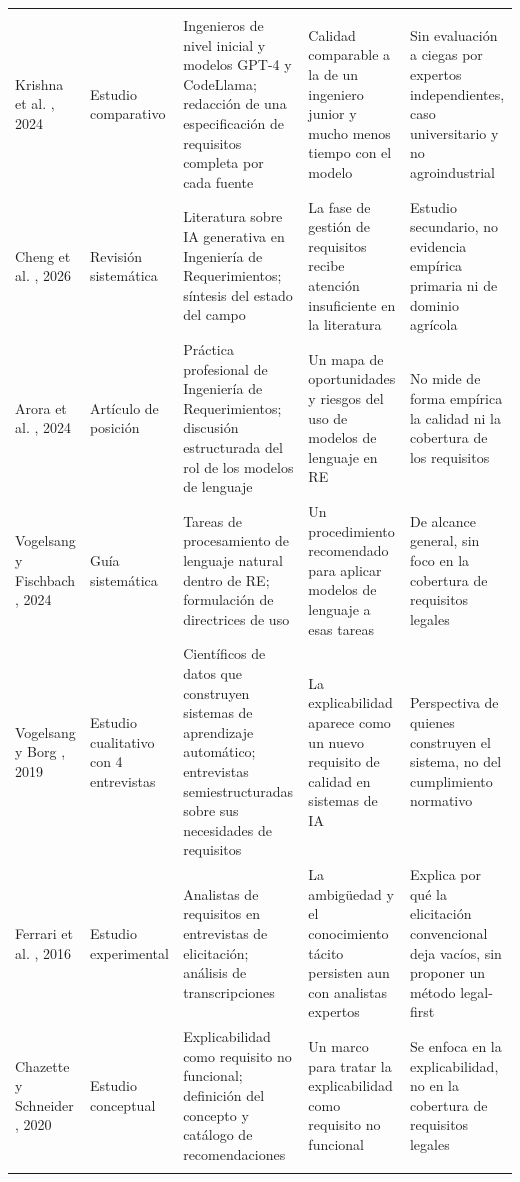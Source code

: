 \documentclass[pdflatex,sn-mathphys-num]{sn-jnl}
\begin{document}
\begin{table}[htbp]
\begin{tabular}{@{}p{2.2cm}p{1.9cm}p{2.6cm}p{2.6cm}p{3.4cm}@{}}
\addlinespace
\multicolumn{5}{@{}l}{\textit{Bloque C. IA generativa y calidad en la elicitaci\'on}} \\
\addlinespace
Krishna et al. \cite{krishna2024}, 2024 & Estudio comparativo & Ingenieros de nivel inicial y modelos GPT-4 y CodeLlama; redacci\'on de una especificaci\'on de requisitos completa por cada fuente & Calidad comparable a la de un ingeniero junior y mucho menos tiempo con el modelo & Sin evaluaci\'on a ciegas por expertos independientes, caso universitario y no agroindustrial \\
\addlinespace
Cheng et al. \cite{cheng2026}, 2026 & Revisi\'on sistem\'atica & Literatura sobre IA generativa en Ingenier\'ia de Requerimientos; s\'intesis del estado del campo & La fase de gesti\'on de requisitos recibe atenci\'on insuficiente en la literatura & Estudio secundario, no evidencia emp\'irica primaria ni de dominio agr\'icola \\
\addlinespace
Arora et al. \cite{arora2024}, 2024 & Art\'iculo de posici\'on & Pr\'actica profesional de Ingenier\'ia de Requerimientos; discusi\'on estructurada del rol de los modelos de lenguaje & Un mapa de oportunidades y riesgos del uso de modelos de lenguaje en RE & No mide de forma emp\'irica la calidad ni la cobertura de los requisitos \\
\addlinespace
Vogelsang y Fischbach \cite{vogelsang2024}, 2024 & Gu\'ia sistem\'atica & Tareas de procesamiento de lenguaje natural dentro de RE; formulaci\'on de directrices de uso & Un procedimiento recomendado para aplicar modelos de lenguaje a esas tareas & De alcance general, sin foco en la cobertura de requisitos legales \\
\addlinespace
Vogelsang y Borg \cite{vogelsang2019}, 2019 & Estudio cualitativo con 4 entrevistas & Cient\'ificos de datos que construyen sistemas de aprendizaje autom\'atico; entrevistas semiestructuradas sobre sus necesidades de requisitos & La explicabilidad aparece como un nuevo requisito de calidad en sistemas de IA & Perspectiva de quienes construyen el sistema, no del cumplimiento normativo \\
\addlinespace
Ferrari et al. \cite{ferrari2016}, 2016 & Estudio experimental & Analistas de requisitos en entrevistas de elicitaci\'on; an\'alisis de transcripciones & La ambig\"uedad y el conocimiento t\'acito persisten aun con analistas expertos & Explica por qu\'e la elicitaci\'on convencional deja vac\'ios, sin proponer un m\'etodo legal-first \\
\addlinespace
Chazette y Schneider \cite{chazette2020}, 2020 & Estudio conceptual & Explicabilidad como requisito no funcional; definici\'on del concepto y cat\'alogo de recomendaciones & Un marco para tratar la explicabilidad como requisito no funcional & Se enfoca en la explicabilidad, no en la cobertura de requisitos legales \\
\botrule
\end{tabular}
\end{table}
\end{document}
